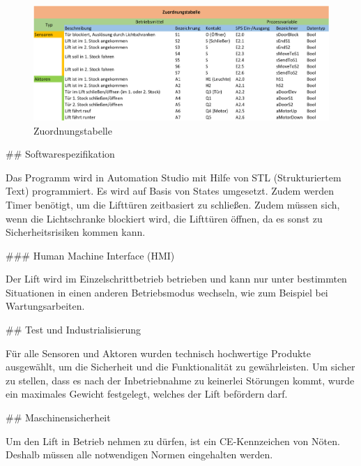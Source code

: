 \begin{markdown}
\begin{figure}[h!]
    \centering
    \includegraphics[width=\textwidth]{./images/Zuordnungstabelle.png}
    \caption[Zuordnungstabelle]{Zuordnungstabelle}
\end{figure}

## Softwarespezifikation

Das Programm wird in Automation Studio mit Hilfe von STL (Strukturiertem Text) programmiert. Es wird auf Basis von States umgesetzt. Zudem werden Timer benötigt, um die Lifttüren zeitbasiert zu schließen. Zudem müssen sich, wenn die Lichtschranke blockiert wird, die Lifttüren öffnen, da es sonst zu Sicherheitsrisiken kommen kann. 

### Human Machine Interface (HMI)

Der Lift wird im Einzelschrittbetrieb betrieben und kann nur unter bestimmten Situationen in einen anderen Betriebsmodus wechseln, wie zum Beispiel bei Wartungsarbeiten.

## Test und Industrialisierung

Für alle Sensoren und Aktoren wurden technisch hochwertige Produkte ausgewählt, um die Sicherheit und die Funktionalität zu gewährleisten. Um sicher zu stellen, dass es nach der Inbetriebnahme zu keinerlei Störungen kommt, wurde ein maximales Gewicht festgelegt, welches der Lift befördern darf.

## Maschinensicherheit

Um den Lift in Betrieb nehmen zu dürfen, ist ein CE-Kennzeichen von Nöten. Deshalb müssen alle notwendigen Normen eingehalten werden.
\end{markdown}
